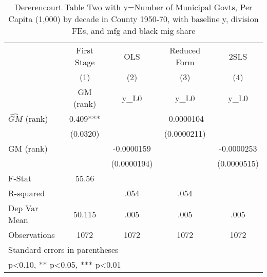 \begin{table}[htbp]\centering
\def\sym#1{\ifmmode^{#1}\else\(^{#1}\)\fi}
\caption{Dererencourt Table Two with y=Number of Municipal Govts, Per Capita (1,000) by decade in County 1950-70, with baseline y, division FEs, and mfg and black mig share}
\begin{tabular}{l*{4}{c}}
\toprule
                    & First Stage   &         OLS   &Reduced Form   &        2SLS   \\
                    &\multicolumn{1}{c}{(1)}&\multicolumn{1}{c}{(2)}&\multicolumn{1}{c}{(3)}&\multicolumn{1}{c}{(4)}\\
                    &\multicolumn{1}{c}{GM  (rank)}&\multicolumn{1}{c}{y\_L0}&\multicolumn{1}{c}{y\_L0}&\multicolumn{1}{c}{y\_L0}\\
\midrule
$\hat{GM}$ (rank)   &       0.409***&               &  -0.0000104   &               \\
                    &    (0.0320)   &               & (0.0000211)   &               \\
\addlinespace
GM  (rank)          &               &  -0.0000159   &               &  -0.0000253   \\
                    &               & (0.0000194)   &               & (0.0000515)   \\
\midrule
F-Stat              &       55.56   &               &               &               \\
R-squared           &               &        .054   &        .054   &               \\
Dep Var Mean        &      50.115   &        .005   &        .005   &        .005   \\
Observations        &        1072   &        1072   &        1072   &        1072   \\
\bottomrule
\multicolumn{5}{l}{\footnotesize Standard errors in parentheses}\\
\multicolumn{5}{l}{\footnotesize * p<0.10, ** p<0.05, *** p<0.01}\\
\end{tabular}
\end{table}
